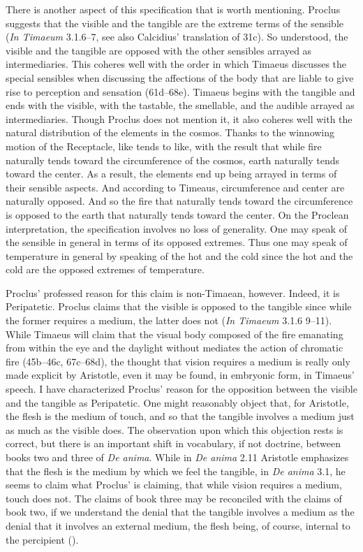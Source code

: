 There is another aspect of this specification that is worth mentioning. Proclus suggests that the visible and the tangible are the extreme terms of the sensible (\emph{In Timaeum} 3.1.6--7, see also Calcidius' translation of 31c). So understood, the visible and the tangible are opposed with the other sensibles arrayed as intermediaries. This coheres well with the order in which Timaeus discusses the special sensibles when discussing the affections of the body that are liable to give rise to perception and sensation (61d--68e). Timaeus begins with the tangible and ends with the visible, with the tastable, the smellable, and the audible arrayed as intermediaries. Though Proclus does not mention it, it also coheres well with the natural distribution of the elements in the cosmos. Thanks to the winnowing motion of the Receptacle, like tends to like, with the result that while fire naturally tends toward the circumference of the cosmos, earth naturally tends toward the center. As a result, the elements end up being arrayed in terms of their sensible aspects. And according to Timeaus, circumference and center are naturally opposed. And so the fire that naturally tends toward the circumference is opposed to the earth that naturally tends toward the center. On the Proclean interpretation, the specification involves no loss of generality. One may speak of the sensible in general in terms of its opposed extremes. Thus one may speak of temperature in general by speaking of the hot and the cold since the hot and the cold are the opposed extremes of temperature.

Proclus' professed reason for this claim is non-Timaean, however. Indeed, it is Peripatetic. Proclus claims that the visible is opposed to the tangible since while the former requires a medium, the latter does not (\emph{In Timaeum} 3.1.6 9--11). While Timaeus will claim that the visual body composed of the fire emanating from within the eye and the daylight without mediates the action of chromatic fire (45b--46c, 67c--68d), the thought that vision requires a medium is really only made explicit by Aristotle, even it may be found, in embryonic form, in Timaeus' speech. I have characterized Proclus' reason for the opposition between the visible and the tangible as Peripatetic. One might reasonably object that, for Aristotle, the flesh is the medium of touch, and so that the tangible involves a medium just as much as the visible does. The observation upon which this objection rests is correct, but there is an important shift in vocabulary, if not doctrine, between books two and three of \emph{De anima}. While in \emph{De anima} 2.11 Aristotle emphasizes that the flesh is the medium by which we feel the tangible, in \emph{De anima} 3.1, he seems to claim what Proclus' is claiming, that while vision requires a medium, touch does not. The claims of book three may be reconciled with the claims of book two, if we understand the denial that the tangible involves a medium as the denial that it involves an external medium, the flesh being, of course, internal to the percipient (\citealt[chapter 2.1.3]{Kalderon:2015fr}). 

